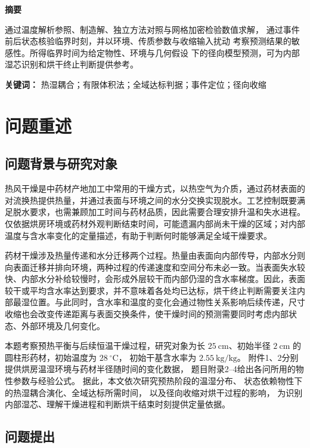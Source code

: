 \documentclass[UTF8,a4paper]{ctexart}
\renewenvironment{abstract}
{
    \par
    \begin{center}
        {\Large\bfseries 摘要}
    \end{center}
    \par\vspace{0.5em}
    \normalsize
}
{
    \par
}
\begin{document}
\begin{abstract}
通过温度解析参照、制造解、独立方法对照与网格加密检验数值求解，
通过事件前后状态核验临界时刻，并以环境、传质参数与收缩输入扰动
考察预测结果的敏感性。所得临界时间为给定物性、环境与几何假设
下的径向模型预测，可为内部湿芯识别和烘干终止判断提供参考。

\vspace{1em}
\noindent\textbf{关键词：}
热湿耦合；有限体积法；全域达标判据；事件定位；径向收缩

\end{abstract}
\newpage

\section{问题重述}

\subsection{问题背景与研究对象}

热风干燥是中药材产地加工中常用的干燥方式，以热空气为介质，通过药材表面的对流换热提供热量，并通过表面与环境之间的水分交换实现脱水。工艺控制既要满足脱水要求，也需兼顾加工时间与药材品质，因此需要合理安排升温和失水进程\cite{wang2024}。仅依据烘房环境或药材外观判断结束时间，可能遗漏内部尚未干燥的区域；对内部温度与含水率变化的定量描述，有助于判断何时能够满足全域干燥要求。

药材干燥涉及热量传递和水分迁移两个过程。热量由表面向内部传导，内部水分则向表面迁移并排向环境，两种过程的传递速度和空间分布未必一致\cite{tzempelikos2015}。当表面失水较快、内部水分补给较慢时，会形成外层较干而内部仍湿的含水率梯度。因此，表面较干或平均含水率达到要求，并不意味着各处均已达标，烘干终止判断需要关注内部最湿位置。与此同时，含水率和温度的变化会通过物性关系影响后续传递，尺寸收缩也会改变传递距离与表面交换条件\cite{wu2022}，使干燥时间的预测需要同时考虑内部状态、外部环境及几何变化。

  本题考察预热平衡与后续恒温干燥过程，研究对象为长
  \(25~\mathrm{cm}\)、初始半径 \(2~\mathrm{cm}\)
  的圆柱形药材，初始温度为 \(28~^\circ\mathrm{C}\)，
  初始干基含水率为 \(2.55~\mathrm{kg/kg}\)。
  附件1、2分别提供烘房温湿环境与药材半径随时间的变化数据，
  题目附录2--4给出各问所用的物性参数与经验公式。
  据此，本文依次研究预热阶段的温湿分布、
  状态依赖物性下的热湿耦合演化、全域达标所需时间，
  以及径向收缩对烘干过程的影响，
  为识别内部湿芯、理解干燥进程和判断烘干结束时刻提供定量依据。

\subsection{问题提出}
\end{document}
